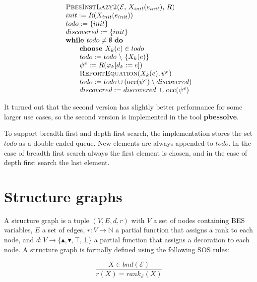 \documentclass{article}
\begin{document}
\begin{equation*}
\begin{array}{l}
\text{\textsc{PbesInstLazy2(}}\mathcal{E}\text{, }X_{init}(e_{init})\text{, } R\text{\textsc{)}} \\
init:=R(X_{init}(e_{init})) \\
todo:=\{init\} \\
discovered:=\{init\} \\
\text{\textbf{while }}todo\neq \emptyset \text{ \textbf{do}} \\
\qquad \text{\textbf{choose }}X_{k}(e)\in todo \\
\qquad todo:=todo\ \backslash \ \{X_{k}(e)\} \\
\qquad \psi ^{e}:=R(\varphi _{k}[d_{k}:=e]) \\
\qquad \text{\textsc{ReportEquation}}(X_{k}(e),\psi ^{e}) \\
\qquad todo:=todo\cup (\mathrm{occ}(\psi ^{e})\setminus discovered) \\
\qquad discovered:=discovered\ \cup \mathrm{occ}(\psi ^{e})
\end{array}
\end{equation*}

It turned out that the second version has slightly better performance for
some larger use cases, so the second version is implemented in the tool \textbf{pbessolve}.

To support breadth first and depth first search, the implementation stores the
set $todo$ as a double ended queue. New elements are always appended to $todo$.
In the case of breadth first search always the first element is chosen, and in the
case of depth first search the last element.

\section{Structure graphs}
A structure graph is a tuple $(V,E,d,r)$ with $V$ a set of nodes containing BES variables,
$E$ a set of edges, $r:V\rightarrow \mathbb{N}$ a partial function that assigns a rank to each node,
and $d:V\rightarrow \{\blacktriangle ,\blacktriangledown ,\top ,\bot \}$ a partial function that
assigns a decoration to each node. A structure graph is formally defined using the
following SOS rules:

\begin{equation*}
\frac{X\in bnd(\mathcal{E})}{r(X) = rank_{\mathcal{E}}(X)}
\end{equation*}
\end{document}
